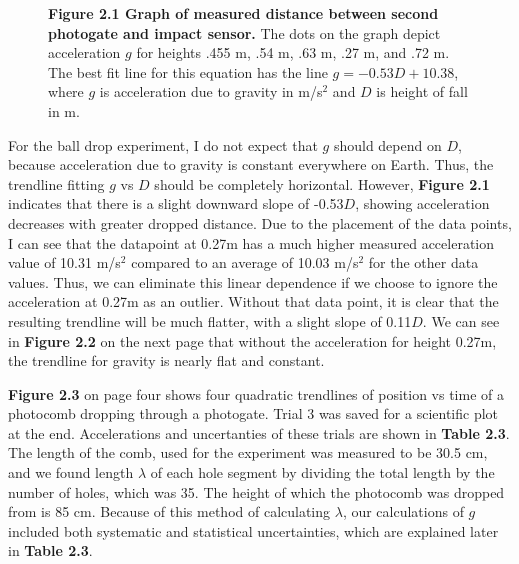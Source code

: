 \documentclass[11pt]{report}
\begin{document}
\begin{figure}[h!]
\captionsetup{labelformat=empty}
\caption{\textbf{Figure 2.1  Graph of measured distance between second photogate and
impact sensor.} The dots on the graph depict acceleration \(g\) for heights .455 m, .54
m, .63 m, .27 m, and .72 m.  The best fit line for this equation has the line
\(g = -0.53D + 10.38\), where \(g\) is acceleration due to gravity in m/s$^2$ and \(D\) is
height of fall in m.}
\end{figure}
For the ball drop experiment, 
I do not expect that \(g\) should depend on \(D\), because acceleration due to
gravity is constant everywhere on Earth.  Thus, the trendline fitting \(g\) vs
\(D\) should be completely horizontal.  However, \textbf{Figure 2.1} indicates that there
is a slight downward slope of -0.53\(D\), showing acceleration decreases with greater dropped
distance.  Due to the placement of the data points, I can see that the
datapoint at 0.27m has a much higher measured acceleration value of 10.31
m/s$^2$ compared to an average of 10.03 m/s$^2$ for the other data values.
Thus, we can eliminate this linear dependence if we choose to ignore the
acceleration at 0.27m as an outlier.  Without that data point, it is clear that
the resulting trendline will be much flatter, with a slight slope of 0.11\(D\).
We can see in \textbf{Figure 2.2} on the next page that without the acceleration 
for height 0.27m, the trendline for gravity is nearly flat and constant.

\setlength{\parindent}{5ex}
\textbf{Figure 2.3} on page four shows four quadratic trendlines of position vs time of a
photocomb dropping through a photogate. Trial 3 was saved for a scientific plot
at the end. Accelerations and uncertanties of these trials are shown in 
\textbf{Table 2.3}.  The length of the comb, used for the experiment was measured to be 30.5 cm, and we 
found length $\lambda$ of each hole segment by dividing the total length by the 
number of holes, which was 35. The height of which the photocomb was dropped from is 85 cm.  
Because of this method of calculating $\lambda$, our calculations of \(g\) included both systematic and statistical 
uncertainties, which are explained later in \textbf{Table 2.3}. 
\end{document}
